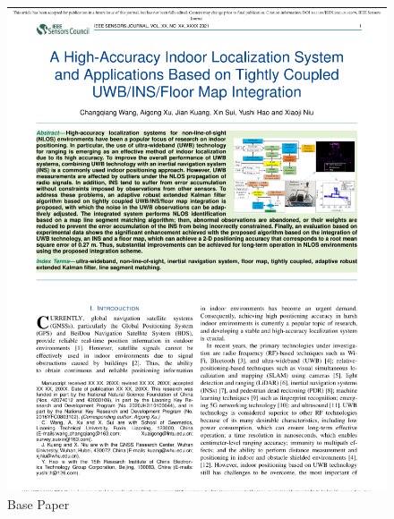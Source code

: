 \newpage
\begin{figure}
    \centering
    \includegraphics[width=\linewidth]{images/Base Paper.png} %
    \caption{Base Paper}
    \label{fig:basepaper}
\end{figure}
